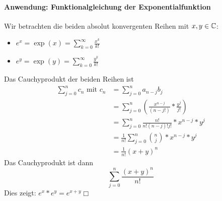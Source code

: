 \paragraph{Anwendung: Funktionalgleichung der Exponentialfunktion}
Wir betrachten die beiden absolut konvergenten Reihen mit $x,y\in\mathbb{C}$:
\begin{itemize}
	\item $e^x=\exp(x)=\sum\limits_{k=0}^\infty \frac{x^k}{k!}$
	\item $e^y=\exp(y)=\sum\limits_{k=0}^\infty \frac{y^k}{k!}$
\end{itemize}
Das Cauchyprodukt der beiden Reihen ist
\begin{align*}
	\sum\limits_{j=0}^n c_n \text{ mit } c_n&=\sum\limits_{j=0}^n a_{n-j}b_j\\
	&=\sum\limits_{j=0}^n \left(\frac{x^{n-j}}{(n-j!)}*\frac{y^j}{j!}\right)\\
	&=\sum\limits_{j=0}^n \frac{n!}{n!(n-j)!j!}*x^{n-j}*y^j\\
	&=\frac{1}{n!} \sum\limits_{j=0}^n \binom{n}{j} *x^{n-j}*y^j\\
	&=\frac{1}{n!} (x+y)^n
\end{align*}
Das Cauchyprodukt ist dann
\begin{equation*}
	\sum\limits_{j=0}^n \frac{(x+y)^n}{n!}
\end{equation*}
Dies zeigt: $e^x*e^y=e^{x+y}$\hfill$\Box$
